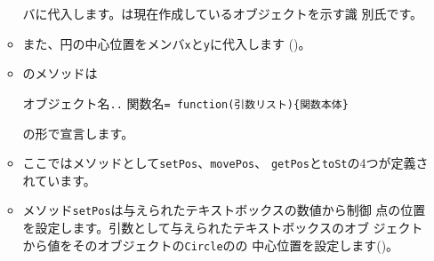 \begin{itemize}
\begin{itemize}
       バに代入します。は現在作成しているオブジェクトを示す識
       別氏です。
 \item また、円の中心位置をメンバ\texttt{x}と\texttt{y}に代入します
       ()。
 \item \JS のメソッドは
\begin{center}
 オブジェクト名\texttt{.}\texttt{.}
       関数名\texttt{= function(引数リスト)\{関数本体\}}
\end{center}
の形で宣言します。
 \item ここではメソッドとして\texttt{setPos}、\texttt{movePos}、
       \texttt{getPos}と\texttt{toSt}の4つが定義されています。
 \item メソッド\texttt{setPos}は与えられたテキストボックスの数値から制御
       点の位置を設定します。引数として与えられたテキストボックスのオブ
       ジェクトから値をそのオブジェクトの\texttt{Circle}のの
       中心位置を設定します()。


\end{itemize}
\end{itemize}
